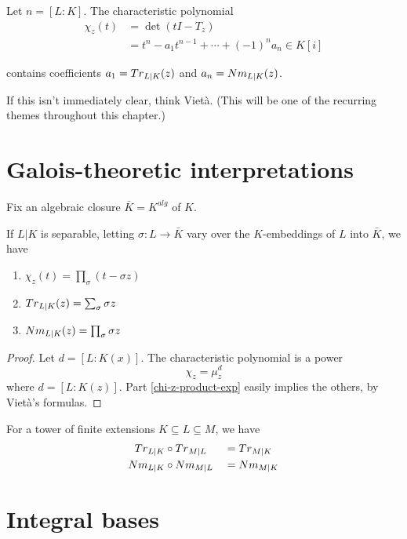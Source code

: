 Let $n = [L : K]$. The characteristic polynomial
\begin{align*}
  \chi_z(t) &= \det (tI - T_z)\\
            &= t^n - a_1t^{n-1} + \cdots + (-1)^n a_n \in K[i]
\end{align*}

contains coefficients $a_1 = {\mathnormal{Tr}}_{L|K}(z)$ and $a_n = {\mathnormal{Nm}}_{L|K}(z)$.

\begin{remark}
  If this isn't immediately clear, think Viet\`a. (This will be one of the
  recurring themes throughout this chapter.)
\end{remark}

\section{Galois-theoretic interpretations}

Fix an algebraic closure $\bar{K} = K^{alg}$ of $K$.

\begin{prop}
  If $L|K$ is separable, letting $\sigma : L \to \bar{K}$ vary over the
  $K$-embeddings of $L$ into $\bar{K}$, we have
  \begin{enumerate}
  \item \label{chi-z-product-exp} $\chi_z(t) = \prod_\sigma (t - \sigma z)$
  \item ${\mathnormal{Tr}}_{L|K}(z) = \sum_\sigma \sigma z$
  \item ${\mathnormal{Nm}}_{L|K}(z) = \prod_\sigma \sigma z$
  \end{enumerate}
\end{prop}

\begin{proof}
  Let $d=[L:K(x)]$. The characteristic polynomial is a power
  \[\chi_z = \mu_z^d \]
  where $d=[L:K(z)]$. Part \ref{chi-z-product-exp} easily implies the others, by
  Viet\`a's formulas.
\end{proof}

\begin{theorem}{\label{mul-trace-norm}}
  For a tower of finite extensions $K \subseteq L \subseteq M$, we have
  \begin{alignat*}{2}
    {\mathnormal{Tr}}_{L|K} &\circ {\mathnormal{Tr}}_{M|L} &&= {\mathnormal{Tr}}_{M|K}\\
    {\mathnormal{Nm}}_{L|K} &\circ {\mathnormal{Nm}}_{M|L} &&= {\mathnormal{Nm}}_{M|K}
  \end{alignat*}
\end{theorem}

\section{Integral bases}

